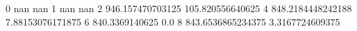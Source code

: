 0 nan nan
1 nan nan
2 946.157470703125 105.820556640625
4 848.2184448242188 7.88153076171875
6 840.3369140625 0.0
8 843.6536865234375 3.3167724609375
